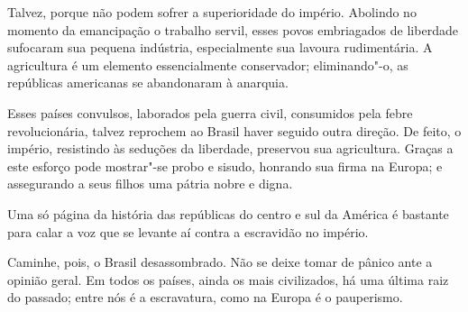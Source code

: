 \begin{linenumbers}
 Talvez, porque não podem sofrer a superioridade do império. Abolindo no
momento da emancipação o trabalho servil, esses povos embriagados de
liberdade sufocaram sua pequena indústria, especialmente sua lavoura
rudimentária. A agricultura é um elemento essencialmente conservador;
eliminando"-o, as repúblicas americanas se abandonaram à anarquia. 

 Esses países convulsos, laborados pela guerra civil, consumidos pela
febre revolucionária, talvez reprochem ao Brasil haver seguido outra 
direção. De feito, o império, resistindo às seduções da liberdade,
preservou sua agricultura. Graças a este esforço pode mostrar"-se
probo e sisudo, honrando sua firma na Europa; e assegurando a seus
filhos uma pátria nobre e digna.

 Uma só página da história das repúblicas do centro e sul da América é
bastante para calar a voz que se levante aí contra a escravidão no império. 

 Caminhe, pois, o Brasil desassombrado. Não se deixe tomar de pânico
ante a opinião geral. Em todos os países, ainda os mais civilizados, há
uma última raiz do passado; entre nós é a escravatura, como na Europa é o pauperismo.

\end{linenumbers}

\sectionitem

